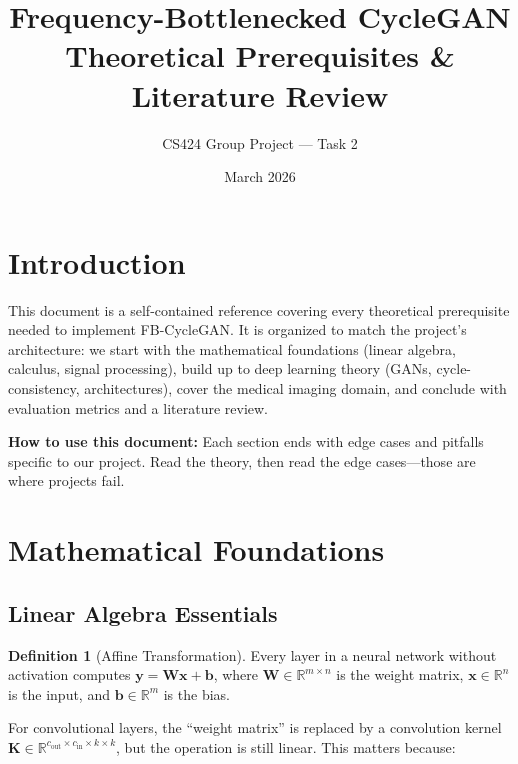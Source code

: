 \documentclass[11pt,a4paper]{article}
\title{\textbf{Frequency-Bottlenecked CycleGAN} \\[0.5em]
\Large Theoretical Prerequisites \& Literature Review}
\author{CS424 Group Project --- Task 2}
\date{March 2026}
\theoremstyle{definition}
\newtheorem{definition}{Definition}[section]
\begin{document}
\maketitle
\tableofcontents
\newpage

\section{Introduction}

This document is a self-contained reference covering every theoretical prerequisite needed to implement FB-CycleGAN. It is organized to match the project's architecture: we start with the mathematical foundations (linear algebra, calculus, signal processing), build up to deep learning theory (GANs, cycle-consistency, architectures), cover the medical imaging domain, and conclude with evaluation metrics and a literature review.

\textbf{How to use this document:} Each section ends with edge cases and pitfalls specific to our project. Read the theory, then read the edge cases---those are where projects fail.

\section{Mathematical Foundations}

\subsection{Linear Algebra Essentials}

\begin{definition}[Affine Transformation]
Every layer in a neural network without activation computes $\bm{y} = \bm{W}\bm{x} + \bm{b}$, where $\bm{W} \in \mathbb{R}^{m \times n}$ is the weight matrix, $\bm{x} \in \mathbb{R}^n$ is the input, and $\bm{b} \in \mathbb{R}^m$ is the bias.
\end{definition}

For convolutional layers, the ``weight matrix'' is replaced by a convolution kernel $\bm{K} \in \mathbb{R}^{c_{\text{out}} \times c_{\text{in}} \times k \times k}$, but the operation is still linear. This matters because:
\end{document}
